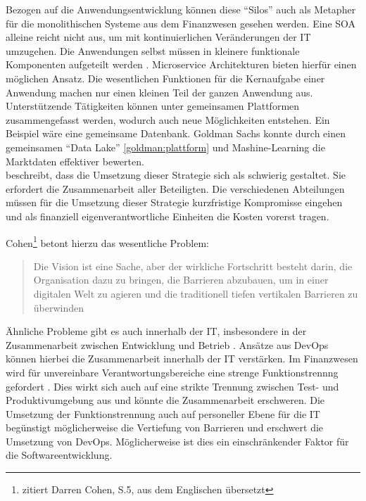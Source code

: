 Bezogen auf die Anwendungsentwicklung können diese \enquote{Silos} auch als Metapher für die monolithischen Systeme \cite{Bussmann2006} aus dem Finanzwesen gesehen werden. Eine \ac{SOA} alleine reicht nicht aus, um mit kontinuierlichen Veränderungen der IT umzugehen. Die Anwendungen selbst müssen in kleinere funktionale Komponenten aufgeteilt werden \cite{Bussmann2006}. Microservice Architekturen bieten hierfür einen möglichen Ansatz. Die wesentlichen Funktionen für die Kernaufgabe einer Anwendung machen nur einen kleinen Teil der ganzen Anwendung aus. Unterstützende Tätigkeiten können unter gemeinsamen Plattformen zusammengefasst werden, wodurch auch neue Möglichkeiten entstehen. Ein Beispiel wäre eine gemeinsame Datenbank. Goldman Sachs konnte durch einen gemeinsamen \enquote{Data Lake} \ref{goldman:plattform} und Mashine-Learning die Marktdaten effektiver bewerten.
\medskip
\\
\citet{Gupta:2017} beschreibt, dass die Umsetzung dieser Strategie sich als schwierig gestaltet. Sie erfordert die Zusammenarbeit aller Beteiligten. Die verschiedenen Abteilungen müssen für die Umsetzung dieser Strategie kurzfristige Kompromisse eingehen und als finanziell eigenverantwortliche Einheiten die Kosten vorerst tragen. 

Cohen\footnote{\citet{Gupta:2017} zitiert Darren Cohen, S.5, aus dem Englischen übersetzt} betont hierzu das wesentliche Problem:
\begin{quote}
    Die Vision ist eine Sache, aber der wirkliche Fortschritt besteht darin, die Organisation dazu zu bringen, die Barrieren abzubauen, um in einer digitalen Welt zu agieren und die traditionell tiefen vertikalen Barrieren zu überwinden
\end{quote}
\medskip
Ähnliche Probleme gibt es auch innerhalb der IT, insbesondere in der Zusammenarbeit zwischen Entwicklung und Betrieb \citet{Disterer2013}. Ansätze aus DevOps \cite{Alt2017} können hierbei die Zusammenarbeit innerhalb der IT verstärken. Im Finanzwesen wird für unvereinbare Verantwortungsbereiche eine strenge Funktionstrennng gefordert \cite{MaRisk:2017}.
Dies wirkt sich auch auf eine strikte Trennung zwischen Test- und Produktivumgebung aus \citet{MaRisk:2017} und könnte die Zusammenarbeit erschweren. Die Umsetzung der Funktionstrennung auch auf personeller Ebene für die IT begünstigt möglicherweise die Vertiefung von Barrieren und erschwert die Umsetzung von DevOps. Möglicherweise ist dies ein einschränkender Faktor für die Softwareentwicklung.

